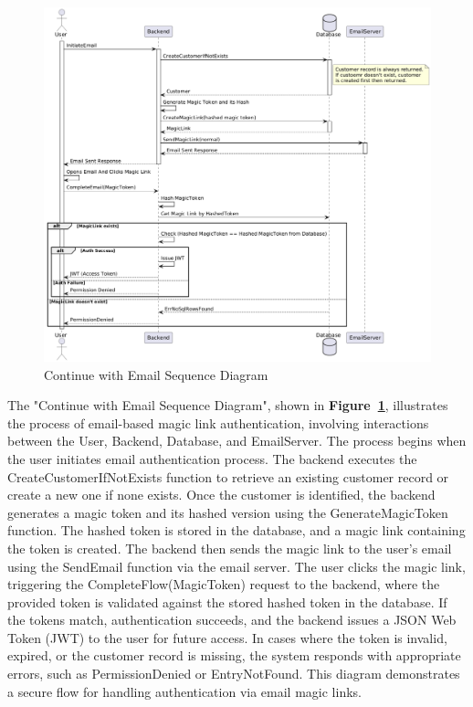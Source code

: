 \begin{figure}[!h]
  \centering
  \includegraphics[width=\textwidth]{images/docs/diagrams/sequence-diagrams/all-sequence-diagrams/Continue with Email.png}
  \caption{Continue with Email Sequence Diagram}
  \label{fig:seq/continue-with-email}
\end{figure}

The "Continue with Email Sequence Diagram", shown in \textbf{Figure~\ref{fig:seq/continue-with-email}}, illustrates the process of email-based magic link authentication, involving interactions between the User, Backend, Database, and EmailServer. The process begins when the user initiates email authentication process. The backend executes the CreateCustomerIfNotExists function to retrieve an existing customer record or create a new one if none exists. Once the customer is identified, the backend generates a magic token and its hashed version using the GenerateMagicToken function. The hashed token is stored in the database, and a magic link containing the token is created. The backend then sends the magic link to the user's email using the SendEmail function via the email server. The user clicks the magic link, triggering the CompleteFlow(MagicToken) request to the backend, where the provided token is validated against the stored hashed token in the database. If the tokens match, authentication succeeds, and the backend issues a JSON Web Token (JWT) to the user for future access. In cases where the token is invalid, expired, or the customer record is missing, the system responds with appropriate errors, such as PermissionDenied or EntryNotFound. This diagram demonstrates a secure flow for handling authentication via email magic links.